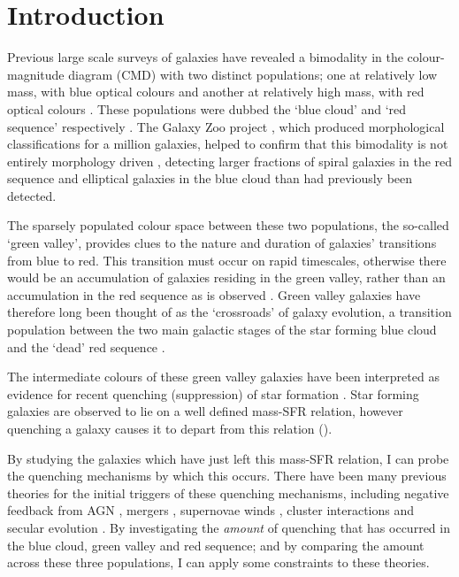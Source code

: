 \chapter{Introduction}

Previous large scale surveys of galaxies have revealed a bimodality in the colour-magnitude diagram (CMD) with two distinct populations; one at relatively low mass, with blue optical colours and another at relatively high mass, with red optical colours \citep{Baldry04, Baldry06, Willmer06, ball08, Brammer09}. These populations were dubbed the `blue cloud' and `red sequence' respectively \citep{Chester64, bower92, Driver06, Faber07}. The Galaxy Zoo project \citep{Lintott11}, which produced morphological classifications for a million galaxies, helped to confirm that this bimodality is not entirely morphology driven \citep{Strat01, Salim07, Sch07, CHV08, Bamford09, Skibba09}, detecting larger fractions of spiral galaxies in the red sequence \citep{masters10c} and elliptical galaxies in the blue cloud \citep{Sch09} than had previously been detected.

The sparsely populated colour space between these two populations, the so-called `green valley', provides clues to the nature and duration of galaxies' transitions from blue to red. This transition must occur on rapid timescales, otherwise there would be an accumulation of galaxies residing in the green valley, rather than an accumulation in the red sequence as is observed \citep{Arnouts07, Martin07}. Green valley galaxies have therefore long been thought of as the `crossroads' of galaxy evolution, a transition population between the two main galactic stages of the star forming blue cloud and the `dead' red sequence \citep{Bell04, Wyder07, Schim07, Martin07, Faber07, Mendez11, Gonc12, schawinski14, Pan14}. 


The intermediate colours of these green valley galaxies have been interpreted as evidence for recent quenching (suppression) of star formation \citep{Salim07}. Star forming galaxies are observed to lie on a well defined mass-SFR relation, however quenching a galaxy causes it to depart from this relation (\citealt{Noeske07, peng10}).


By studying the galaxies which  have just left this mass-SFR relation, I can probe the quenching mechanisms by which this occurs. There have been many previous theories for the initial triggers of these quenching mechanisms, including negative feedback from AGN \citep{diMatteo05, Martin07, Nandra07, Sch07}, mergers \citep{Darg10a, Cheung12, Barro13}, supernovae winds \citep{MFB12}, cluster interactions \citep{Coil08, Mendez11, Fang13} and secular evolution \citep{masters10c, masters11a, Mendez11}. By investigating the \emph{amount} of quenching that has occurred in the blue cloud, green valley and red sequence; and by comparing the amount across these three populations, I can apply some constraints to these theories. 


